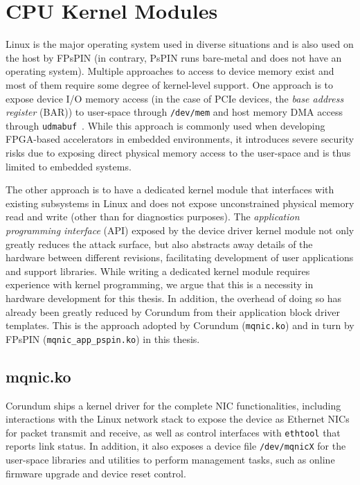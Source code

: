 \section{CPU Kernel Modules} \label{sec:sw-kmod}

Linux is the major operating system used in diverse situations and is also used on the host by FPsPIN (in contrary, PsPIN runs bare-metal and does not have an operating system).  Multiple approaches to access to device memory exist and most of them require some degree of kernel-level support.  One approach is to expose device I/O memory access (in the case of PCIe devices, the \emph{base address register} (BAR)) to user-space through \texttt{/dev/mem} and host memory DMA access through \texttt{udmabuf}~\cite{ichiro_u-dma-bufuser_2023}.  While this approach is commonly used when developing FPGA-based accelerators in embedded environments, it introduces severe security risks due to exposing direct physical memory access to the user-space and is thus limited to embedded systems.

The other approach is to have a dedicated kernel module that interfaces with existing subsystems in Linux and does not expose unconstrained physical memory read and write (other than for diagnostics purposes).  The \emph{application programming interface} (API) exposed by the device driver kernel module not only greatly reduces the attack surface, but also abstracts away details of the hardware between different revisions, facilitating development of user applications and support libraries.  While writing a dedicated kernel module requires experience with kernel programming, we argue that this is a necessity in hardware development for this thesis.  In addition, the overhead of doing so has already been greatly reduced by Corundum from their application block driver templates.  This is the approach adopted by Corundum (\texttt{mqnic.ko}) and in turn by FPsPIN (\texttt{mqnic\_\-app\_\-pspin.ko}) in this thesis.  

\subsection{mqnic.ko}

Corundum ships a kernel driver for the complete NIC functionalities, including interactions with the Linux network stack to expose the device as Ethernet NICs for packet transmit and receive, as well as control interfaces with \texttt{ethtool} that reports link status.  In addition, it also exposes a device file \texttt{/dev/mqnicX} for the user-space libraries and utilities to perform management tasks, such as online firmware upgrade and device reset control.

